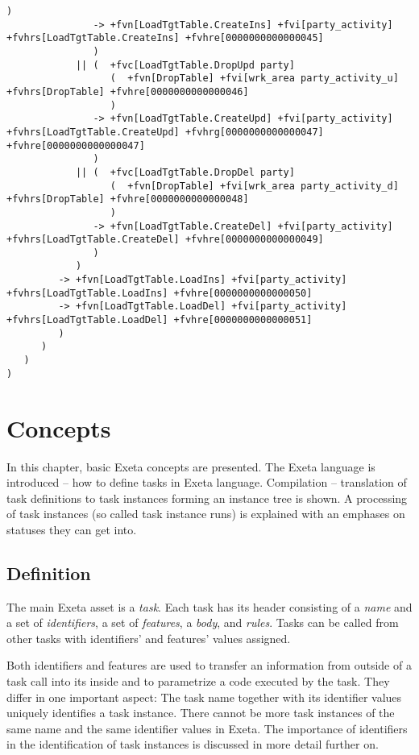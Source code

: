 \documentclass[a4paper,12pt,english,oneside]{book}
\newcommand{\exeta}{Exeta\xspace}
\begin{document}
\begin{landscape}
\begin{Verbatim}[commandchars=+\[\]]
                  )
               -> +fvn[LoadTgtTable.CreateIns] +fvi[party_activity] +fvhrs[LoadTgtTable.CreateIns] +fvhre[0000000000000045]
               )  
            || (  +fvc[LoadTgtTable.DropUpd party]
                  (  +fvn[DropTable] +fvi[wrk_area party_activity_u] +fvhrs[DropTable] +fvhre[0000000000000046]
                  )
               -> +fvn[LoadTgtTable.CreateUpd] +fvi[party_activity] +fvhrs[LoadTgtTable.CreateUpd] +fvhrg[0000000000000047] +fvhre[0000000000000047]
               )  
            || (  +fvc[LoadTgtTable.DropDel party]
                  (  +fvn[DropTable] +fvi[wrk_area party_activity_d] +fvhrs[DropTable] +fvhre[0000000000000048]
                  )
               -> +fvn[LoadTgtTable.CreateDel] +fvi[party_activity] +fvhrs[LoadTgtTable.CreateDel] +fvhre[0000000000000049]
               )  
            )  
         -> +fvn[LoadTgtTable.LoadIns] +fvi[party_activity] +fvhrs[LoadTgtTable.LoadIns] +fvhre[0000000000000050]
         -> +fvn[LoadTgtTable.LoadDel] +fvi[party_activity] +fvhrs[LoadTgtTable.LoadDel] +fvhre[0000000000000051]
         )  
      )  
   )  
)  
\end{Verbatim}
\end{landscape}

\chapter{Concepts}

In this chapter, basic \exeta concepts are presented. The \exeta language is introduced -- how to define tasks in \exeta language. Compilation -- translation of task definitions to task instances forming an instance tree is shown. A processing of task instances (so called task instance runs) is explained with an emphases on statuses they can get into.

\section{Definition}

The main \exeta asset is a \emph{task}. Each task has its header consisting of a \emph{name} and a set of \emph{identifiers}, a set of \emph{features}, a \emph{body}, and \emph{rules}. Tasks can be called from other tasks with identifiers' and features' values assigned.

Both identifiers and features are used to transfer an information from outside of a task call into its inside and to parametrize a code executed by the task. They differ in one important aspect: The task name together with its identifier values uniquely identifies a task instance. There cannot be more task instances of the same name and the same identifier values in \exeta. The importance of identifiers in the identification of task instances is discussed in more detail further on.
\end{document}
